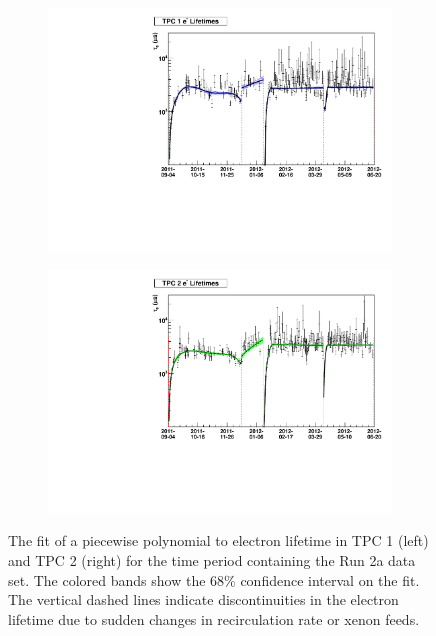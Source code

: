 \documentclass[herrin-thesis.tex]{subfiles}
\begin{document}
\begin{figure}[tbp]
\begin{subfigure}[b]{0.5\linewidth}
\centering
\includegraphics[width=1.0\columnwidth]{./plots/el_trend_tpc1.pdf}
\end{subfigure}\hfill%
\begin{subfigure}[b]{0.5\linewidth}
\centering
\includegraphics[width=1.0\columnwidth]{./plots/el_trend_tpc2.pdf}
\end{subfigure}
\caption[Fits to time-varying electron lifetime]{The fit of a piecewise polynomial to electron lifetime in TPC 1 (left) and TPC 2 (right) for the time period containing the Run 2a data set. The colored bands show the 68\% confidence interval on the fit. The vertical dashed lines indicate discontinuities in the electron lifetime due to sudden changes in recirculation rate or xenon feeds.}
\label{fig:el_time_variation}
\end{figure}
\end{document}

